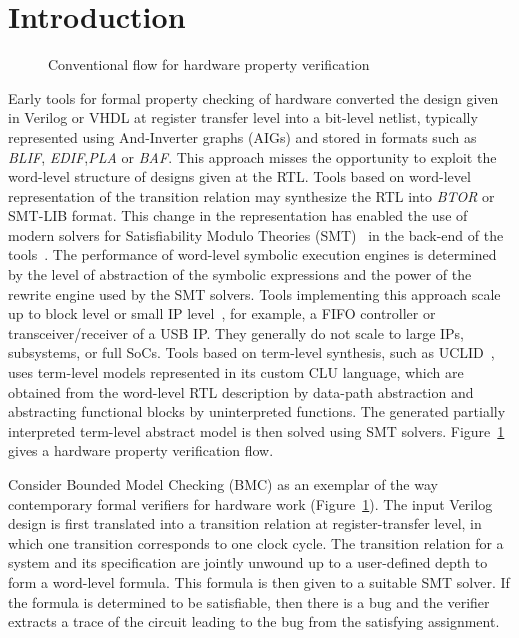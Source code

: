 \section{Introduction}\label{sec:intro}
%
\begin{figure}[htbp]
\centering
\vspace*{0.3cm}
\caption{Conventional flow for hardware property verification\label{fig:desc}}
\end{figure}
%

Early tools for formal property checking of hardware converted the design 
given in Verilog or VHDL at register transfer level into a bit-level netlist, 
typically represented using And-Inverter graphs (AIGs) and stored in formats 
such as \emph{BLIF}, \emph{EDIF},\emph{PLA} or \emph{BAF}.  This approach misses 
the opportunity to 
exploit the word-level structure of designs given at the RTL.  
Tools based on word-level representation of the transition 
relation may synthesize the RTL into \emph{BTOR} or SMT-LIB format.  
This change in the representation has enabled the use of modern solvers for
Satisfiability Modulo Theories (SMT)~\cite{decision_procedures} in the
back-end of the tools~\cite{DBLP:conf/lpar/AndrausLS08,soc-keating,DBLP:conf/mtv/SunkariCVM07,DBLP:conf/cav/Bjesse08}.  
The performance of word-level symbolic execution
engines is determined by the level of abstraction of the symbolic
expressions and the power of the rewrite engine used by the SMT solvers. 
Tools implementing this approach scale up to block level or small IP
level~\cite{soc-keating,DBLP:conf/mtv/SunkariCVM07},
for example, a FIFO controller or transceiver/receiver of a USB IP.  They
generally do not scale to large IPs, subsystems, or full SoCs.
Tools based on term-level synthesis, such as 
UCLID~\cite{uclid}, uses term-level models represented in its custom CLU 
language, which are obtained from the word-level RTL description by 
data-path abstraction and abstracting functional blocks by uninterpreted 
functions.  The generated partially interpreted term-level abstract model 
is then solved using SMT solvers.  Figure~\ref{fig:desc} gives a hardware 
property verification flow. 

Consider Bounded Model Checking (BMC) as an exemplar of the way
contemporary formal verifiers for hardware work (Figure~\ref{fig:desc}). 
The input Verilog design is first translated into a transition
relation at register-transfer level, in which one transition 
corresponds to one clock cycle.  The transition relation for a system 
and its specification are jointly unwound up to a user-defined depth to 
form a word-level formula.  This formula is then given to a 
suitable SMT solver. If the formula is determined to be satisfiable, 
then there is a bug and the verifier extracts a trace of the circuit leading to
the bug from the satisfying assignment.  




